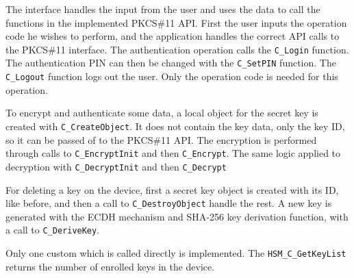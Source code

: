 The interface handles the input from the user and uses the data to call the functions in the implemented PKCS\#11 API.
First the user inputs the operation code he wishes to perform, and the application handles the correct API calls to the PKCS\#11 interface.
The authentication operation calls the \texttt{C\_Login} function. The authentication PIN can then be changed with the \texttt{C\_SetPIN} function.
The \texttt{C\_Logout} function logs out the user. Only the operation code is needed for this operation.

To encrypt and authenticate some data, a local object for the secret key is created with \texttt{C\_CreateObject}. It does not contain the key data, only the key ID, so it can be passed of to the PKCS\#11 API. The encryption is performed through calls to \texttt{C\_EncryptInit} and then \texttt{C\_Encrypt}.
The same logic applied to decryption with \texttt{C\_DecryptInit} and then \texttt{C\_Decrypt}

For deleting a key on the device, first a secret key object is created with its ID, like before, and then a call to \texttt{C\_DestroyObject} handle the rest.
A new key is generated with the ECDH mechanism and \ac{SHA}-256 key derivation function, with a call to \texttt{C\_DeriveKey}.

Only one custom which is called directly is implemented. The \texttt{HSM\_C\_GetKeyList} returns the number of enrolled keys in the device.
